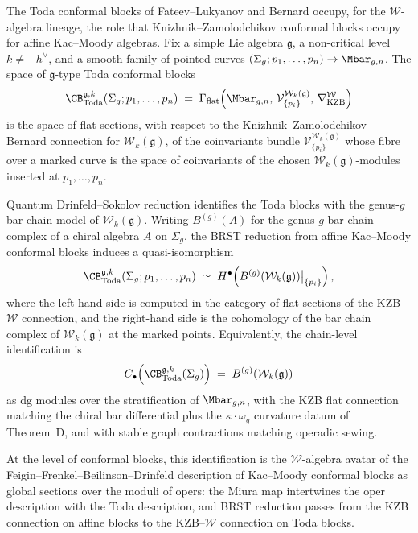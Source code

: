 \begin{remark}
\label{rem:toda-conformal-blocks}
The Toda conformal blocks of Fateev--Lukyanov \cite{FL88} and
Bernard \cite{Ber90} occupy, for the $\mathcal{W}$-algebra lineage,
the role that Knizhnik--Zamolodchikov conformal blocks occupy for
affine Kac--Moody algebras. Fix a simple Lie algebra $\mathfrak{g}$,
a non-critical level $k \neq -h^\vee$, and a smooth family of pointed
curves $(\Sigma_g; p_1, \dots, p_n) \to \Mbar_{g,n}$. The space of
$\mathfrak{g}$-type Toda conformal blocks
\[
 \CB_{\mathrm{Toda}}^{\mathfrak{g},k}(\Sigma_g; p_1, \dots, p_n)
 \;=\;
 \Gamma_{\mathrm{flat}}\!\left(
 \Mbar_{g,n},\,
 \mathcal{V}^{\mathcal{W}_k(\mathfrak{g})}_{\{p_i\}},\,
 \nabla_{\mathrm{KZB}}^{\mathcal{W}}
 \right)
\]
is the space of flat sections, with respect to the
Knizhnik--Zamolodchikov--Bernard connection for
$\mathcal{W}_k(\mathfrak{g})$, of the coinvariants bundle
$\mathcal{V}^{\mathcal{W}_k(\mathfrak{g})}_{\{p_i\}}$ whose fibre
over a marked curve is the space of coinvariants of the chosen
$\mathcal{W}_k(\mathfrak{g})$-modules inserted at $p_1, \dots, p_n$.

Quantum Drinfeld--Sokolov reduction identifies the Toda blocks with
the genus-$g$ bar chain model of $\mathcal{W}_k(\mathfrak{g})$.
Writing $B^{(g)}(A)$ for the genus-$g$ bar chain complex of a chiral
algebra $A$ on $\Sigma_g$, the BRST reduction from affine Kac--Moody
conformal blocks induces a quasi-isomorphism
\[
 \CB_{\mathrm{Toda}}^{\mathfrak{g},k}(\Sigma_g; p_1, \dots, p_n)
 \;\simeq\;
 H^\bullet\!\left(
 B^{(g)}(\mathcal{W}_k(\mathfrak{g}))\big|_{\{p_i\}}
 \right),
\]
where the left-hand side is computed in the category of flat sections
of the KZB--$\mathcal{W}$ connection, and the right-hand side is the
cohomology of the bar chain complex of $\mathcal{W}_k(\mathfrak{g})$
at the marked points. Equivalently, the chain-level identification is
\[
 C_\bullet\!\left(
 \CB_{\mathrm{Toda}}^{\mathfrak{g},k}(\Sigma_g)
 \right)
 \;=\;
 B^{(g)}(\mathcal{W}_k(\mathfrak{g}))
\]
as dg modules over the stratification of $\Mbar_{g,n}$, with the KZB
flat connection matching the chiral bar differential plus the
$\kappa \cdot \omega_g$ curvature datum of Theorem~D, and with stable
graph contractions matching operadic sewing.

At the level of conformal blocks, this identification is the
$\mathcal{W}$-algebra avatar of the Feigin--Frenkel--Beilinson--Drinfeld
description of Kac--Moody conformal blocks as global sections over the
moduli of opers: the Miura map intertwines the oper description with
the Toda description, and BRST reduction passes from the KZB connection
on affine blocks to the KZB--$\mathcal{W}$ connection on Toda blocks.


\end{remark}
